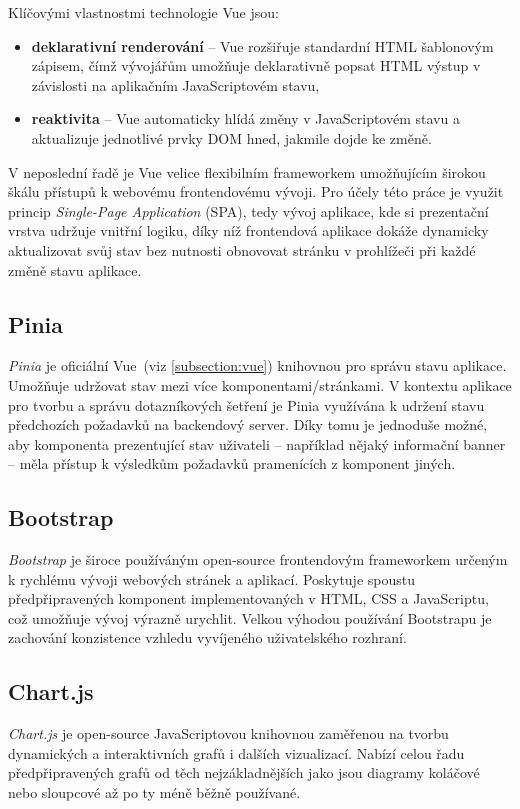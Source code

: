 Klíčovými vlastnostmi technologie Vue jsou:
\begin{itemize}
    \item \textbf{deklarativní renderování} – Vue rozšiřuje standardní HTML šablonovým zápisem, čímž vývojářům umožňuje deklarativně popsat HTML výstup v závislosti na aplikačním JavaScriptovém stavu,
    \item \textbf{reaktivita} – Vue automaticky hlídá změny v JavaScriptovém stavu a aktualizuje jednotlivé prvky DOM hned, jakmile dojde ke změně.
\end{itemize}
V neposlední řadě je Vue velice flexibilním frameworkem umožňujícím širokou škálu přístupů k webovému frontendovému vývoji. Pro účely této práce je využit princip \textit{Single-Page Application} (SPA), tedy vývoj aplikace, kde si prezentační vrstva udržuje vnitřní logiku, díky níž frontendová aplikace dokáže dynamicky aktualizovat svůj stav bez nutnosti obnovovat stránku v prohlížeči při každé změně stavu aplikace. \cite{vue}

\subsection{Pinia}
\textit{Pinia} je oficiální Vue~(viz \ref{subsection:vue}) knihovnou pro správu stavu aplikace.
Umožňuje udržovat stav mezi více komponentami/stránkami. V kontextu aplikace pro tvorbu a správu dotazníkových šetření je 
Pinia využívána k udržení stavu předchozích požadavků na backendový server. Díky tomu je jednoduše možné, aby komponenta 
prezentující stav uživateli – například nějaký informační banner – měla přístup k výsledkům požadavků pramenících z komponent jiných.~\cite{pinia}

\subsection{Bootstrap}
\textit{Bootstrap} je široce používáným open-source frontendovým frameworkem určeným
k rychlému vývoji webových stránek a aplikací. Poskytuje spoustu předpřipravených komponent
implementovaných v HTML, CSS a JavaScriptu, což umožňuje vývoj výrazně urychlit. Velkou
výhodou používání Bootstrapu je zachování konzistence vzhledu vyvíjeného uživatelského
rozhraní.~\cite{bootstrap}

\subsection{Chart.js}
\label{subsection:chartjs}
\textit{Chart.js} je open-source JavaScriptovou knihovnou zaměřenou na tvorbu dynamických
a interaktivních grafů i dalších vizualizací. Nabízí celou řadu předpřipravených grafů od
těch nejzákladnějších jako jsou diagramy koláčové nebo sloupcové až po ty méně běžně používané.~\cite{chartjs}


